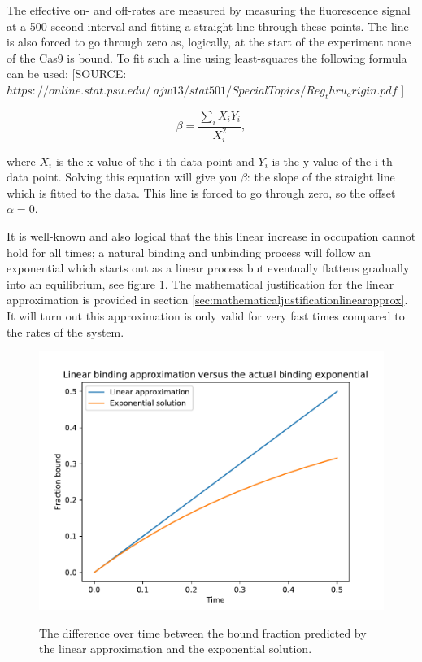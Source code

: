 The effective on- and off-rates are measured by measuring the fluorescence signal at a 500 second interval and fitting a straight line through these points. The line is also forced to go through zero as, logically, at the start of the experiment none of the Cas9 is bound. To fit such a line using least-squares the following formula can be used: [SOURCE: $https://online.stat.psu.edu/~ajw13/stat501/SpecialTopics/Reg_thru_origin.pdf$ ]

\begin{equation}
\beta = \frac{\sum_i X_iY_i}{X_i^2},
\label{eq:slopeleastsquares}
\end{equation}

where $X_i$ is the x-value of the i-th data point and $Y_i$ is the y-value of the i-th data point. Solving this equation will give you $\beta$: the slope of the straight line which is fitted to the data. This line is forced to go through zero, so the offset $\alpha = 0$.

It is well-known and also logical that the this linear increase in occupation cannot hold for all times; a natural binding and unbinding process will follow an exponential which starts out as a linear process but eventually flattens gradually into an equilibrium, see figure \ref{fig:linearvexponentialexample}. The mathematical justification for the linear approximation is provided in section \ref{sec:mathematicaljustificationlinearapprox}. It will turn out this approximation is only valid for very fast times compared to the rates of the system.


\begin{figure}
\begin{center}
\includegraphics[width=\textwidth]{images/linearvexponentialexample}
\label{fig:linearvexponentialexample}
\caption{The difference over time between the bound fraction predicted by the linear approximation and the exponential solution. }
\end{center}
\end{figure}

